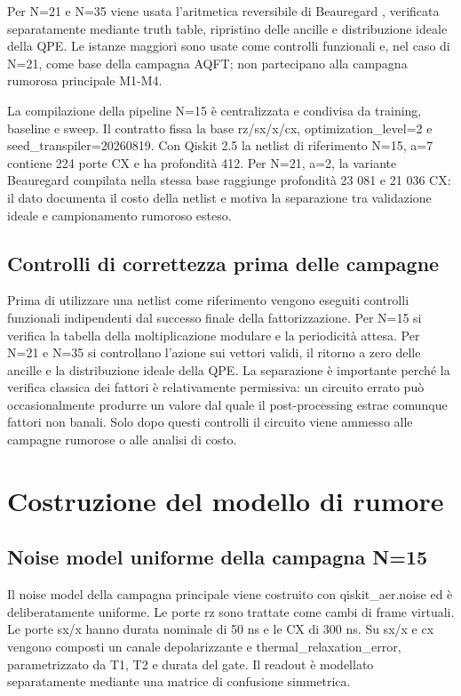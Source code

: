Per N=21 e N=35 viene usata l'aritmetica reversibile di Beauregard \cite{beauregard2002}, verificata separatamente mediante truth table, ripristino delle ancille e distribuzione ideale della QPE. Le istanze maggiori sono usate come controlli funzionali e, nel caso di N=21, come base della campagna AQFT; non partecipano alla campagna rumorosa principale M1-M4.

La compilazione della pipeline N=15 è centralizzata e condivisa da training, baseline e sweep. Il contratto fissa la base rz/sx/x/cx, optimization\_level=2 e seed\_transpiler=20260819. Con Qiskit 2.5 la netlist di riferimento N=15, a=7 contiene 224 porte CX e ha profondità 412. Per N=21, a=2, la variante Beauregard compilata nella stessa base raggiunge profondità 23 081 e 21 036 CX: il dato documenta il costo della netlist e motiva la separazione tra validazione ideale e campionamento rumoroso esteso.

\subsection{Controlli di correttezza prima delle campagne}\label{sec:finale_4_3_3}

Prima di utilizzare una netlist come riferimento vengono eseguiti controlli funzionali indipendenti dal successo finale della fattorizzazione. Per N=15 si verifica la tabella della moltiplicazione modulare e la periodicità attesa. Per N=21 e N=35 si controllano l'azione sui vettori validi, il ritorno a zero delle ancille e la distribuzione ideale della QPE. La separazione è importante perché la verifica classica dei fattori è relativamente permissiva: un circuito errato può occasionalmente produrre un valore dal quale il post-processing estrae comunque fattori non banali. Solo dopo questi controlli il circuito viene ammesso alle campagne rumorose o alle analisi di costo.

\section{Costruzione del modello di rumore}\label{sec:finale_4_4}

\subsection{Noise model uniforme della campagna N=15}\label{sec:finale_4_4_1}

Il noise model della campagna principale viene costruito con qiskit\_aer.noise ed è deliberatamente uniforme. Le porte rz sono trattate come cambi di frame virtuali. Le porte sx/x hanno durata nominale di 50 ns e le CX di 300 ns. Su sx/x e cx vengono composti un canale depolarizzante e thermal\_relaxation\_error, parametrizzato da T1, T2 e durata del gate. Il readout è modellato separatamente mediante una matrice di confusione simmetrica.

